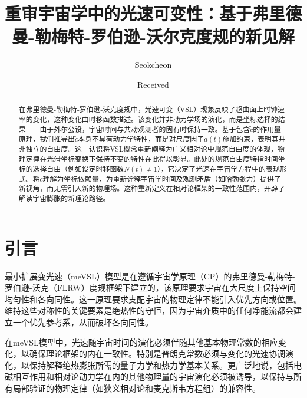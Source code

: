 \documentclass[jkps,preprint,fleqn]{revtex4}
\newcommand{\tc}{\tilde{c}}
\begin{document}
\setcounter{page}{0}

\title[]{重审宇宙学中的光速可变性：基于弗里德曼-勒梅特-罗伯逊-沃尔克度规的新见解}
\author{Seokcheon }

\date[]{Received }

\begin{abstract}
在弗里德曼-勒梅特-罗伯逊-沃克度规中，光速可变（VSL）现象反映了超曲面上时钟速率的变化，这种变化由时移函数描述。该变化并非动力学场的演化，而是坐标选择的结果——由于外尔公设，宇宙时间与共动观测者的固有时保持一致。基于包含$\tc$的作用量原理，我们推导出$\tc$本身不具有动力学特性，而是对尺度因子$a(t)$施加约束，表明其并非独立的自由度。这一认识将VSL概念重新阐释为广义相对论中规范自由度的体现，物理定律在光滑坐标变换下保持不变的特性在此得以彰显。此处的规范自由度特指时间坐标的选择自由（例如设定时移函数$N(t) \neq 1$），它决定了光速在宇宙学方程中的表现形式。将$\tc$理解为坐标依赖量，为重新诠释宇宙学时间及观测矛盾（如哈勃张力）提供了新视角，而无需引入新的物理场。这种重新定义在相对论框架的一致性范围内，开辟了解读宇宙膨胀的新理论路径。
\end{abstract}

\maketitle

\tableofcontents
\section{引言}
\label{sec:intro}

最小扩展变光速（meVSL）模型是在遵循宇宙学原理（CP）的弗里德曼-勒梅特-罗伯逊-沃克（FLRW）度规框架下建立的，该原理要求宇宙在大尺度上保持空间均匀性和各向同性\cite{Lee:2020zts,Lee:2023bjz,Lee:2024mal}。这一原理要求支配宇宙的物理定律不能引入优先方向或位置。维持这些对称性的关键要素是绝热性的守恒，因为宇宙介质中的任何净能流都会建立一个优先参考系，从而破坏各向同性\cite{Lee:2022heb}。

在meVSL模型中，光速随宇宙时间的演化必须伴随其他基本物理常数的相应变化，以确保理论框架的内在一致性。特别是普朗克常数必须与变化的光速协调演化，以保持解释绝热膨胀所需的量子力学和热力学基本关系\cite{Lee:2022heb}。更广泛地说，包括电磁相互作用和相对论动力学在内的其他物理量的宇宙演化必须被诱导，以保持与所有局部验证的物理定律（如狭义相对论和麦克斯韦方程组）的兼容性\cite{Lee:2020zts,Lee:2023bjz,Lee:2024mal,Lee:2022heb}。
\end{document}
